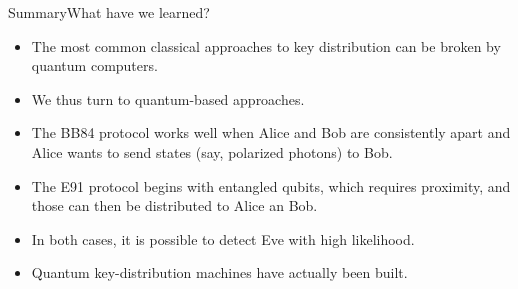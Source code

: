 \begin{frame}{Summary}{What have we learned?}
\begin{itemize}
    \item The most common classical approaches to key distribution can be broken by quantum computers.
    \item We thus turn to quantum-based approaches.
    \item The BB84 protocol works well when Alice and Bob are consistently apart and Alice wants to send states (say, polarized photons) to Bob.
    \item The E91 protocol begins with entangled qubits, which requires proximity, and those can then be distributed to Alice an Bob.
    \item In both cases, it is possible to detect Eve with high likelihood.
    \item Quantum key-distribution machines have actually been built.
\end{itemize}
\end{frame}